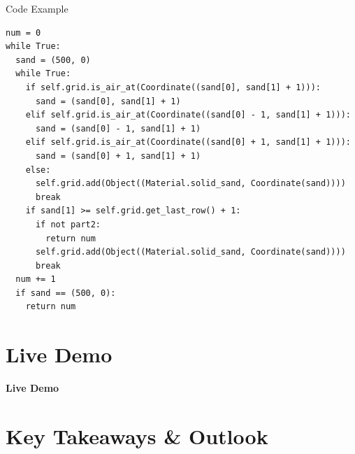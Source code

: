 \documentclass{beamer}
\begin{document}
\setcounter{framenumber}{8}
\begin{frame}[fragile,t]{Code Example}
    \begin{verbatim}
num = 0
while True:
  sand = (500, 0)
  while True:
    if self.grid.is_air_at(Coordinate((sand[0], sand[1] + 1))):
      sand = (sand[0], sand[1] + 1)
    elif self.grid.is_air_at(Coordinate((sand[0] - 1, sand[1] + 1))):
      sand = (sand[0] - 1, sand[1] + 1)
    elif self.grid.is_air_at(Coordinate((sand[0] + 1, sand[1] + 1))):
      sand = (sand[0] + 1, sand[1] + 1)
    else:
      self.grid.add(Object((Material.solid_sand, Coordinate(sand))))
      break
    if sand[1] >= self.grid.get_last_row() + 1:
      if not part2:
        return num
      self.grid.add(Object((Material.solid_sand, Coordinate(sand))))
      break
  num += 1
  if sand == (500, 0):
    return num
    \end{verbatim}
\end{frame}

\section{Live Demo}

\begin{frame}
    \centering
    \Huge
    \textbf{Live Demo}
\end{frame}

\section{Key Takeaways \& Outlook}
\end{document}

